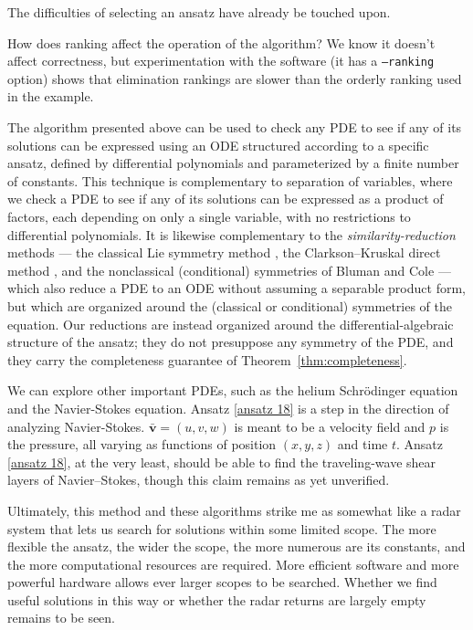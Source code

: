 \documentclass{article}
\theoremstyle{definition}
\theoremstyle{plain}
\begin{document}
The difficulties of selecting an ansatz have already be touched upon.


How does ranking affect the operation of the algorithm?  We know it doesn't affect correctness, but experimentation with
the software (it has a {\tt --ranking} option) shows that elimination rankings are slower than the orderly ranking used in the example.

The algorithm presented above can be used to check any PDE to see if any of its solutions
can be expressed using an ODE structured according to a specific ansatz, defined by
differential polynomials and parameterized by a finite number of constants.
This technique
is complementary to separation of variables, where we check a PDE to see if any of
its solutions can be expressed as a product of factors, each depending on only
a single variable, with no restrictions to differential polynomials.
It is likewise complementary to the {\it similarity-reduction} methods --- the
classical Lie symmetry method \cite{Olver}, the Clarkson--Kruskal direct method
\cite{ClarksonKruskal,ClarksonMansfield}, and the nonclassical (conditional) symmetries of Bluman
and Cole \cite{BlumanCole} --- which also reduce a PDE to an ODE without assuming
a separable product form, but which are organized around the (classical or
conditional) symmetries of the equation.  Our reductions are instead organized
around the differential-algebraic structure of the ansatz; they do not
presuppose any symmetry of the PDE, and they carry the completeness guarantee of
Theorem~\ref{thm:completeness}.

We can explore other important PDEs, such as the helium Schr\"odinger equation and the Navier-Stokes equation.
Ansatz \eqref{ansatz 18} is a step in the direction
of analyzing Navier-Stokes.  $\mathbf{\bar{v}} = (u,v,w)$ is meant to be a velocity field
and $p$ is the pressure, all varying as functions of position $(x,y,z)$ and time $t$.
Ansatz \eqref{ansatz 18}, at the very least, should be able to find the traveling-wave shear layers of Navier–Stokes,
though this claim remains as yet unverified.

Ultimately, this method and these algorithms strike me as somewhat like a radar system
that lets us search for solutions within some limited scope.  The more flexible the ansatz, the wider the scope,
the more numerous are its constants, and the more computational resources are required.
More efficient software and more powerful hardware allows ever larger scopes to be searched.  Whether we find
useful solutions in this way or whether the radar returns are largely empty remains to be seen.
\end{document}
